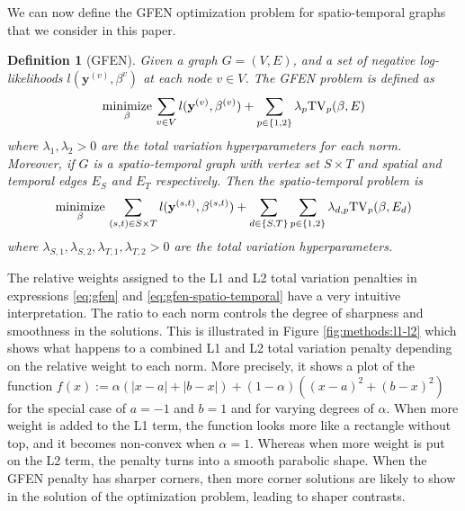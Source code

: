 \documentclass[a4paper, 11pt]{article}
\newtheorem{mydef}{Definition}
\begin{document}
We can now define the GFEN optimization problem for spatio-temporal graphs that we consider in this paper.

\begin{mydef}[GFEN]
Given a graph $G=(V, E)$, and a set of negative log-likelihoods $l(\mathbf{y}^{(v)}, \beta^{v})$ at each node $v\in V$. The GFEN problem is defined as 
\begin{equation}\label{eq:gfen}
    \operatornamewithlimits{minimize}_{\beta} \, \sum_{v \in V} l(\mathbf{y}^{(v)}, \beta^{(v)}) + \sum_{p \in \{1,2\}} \lambda_p \mathrm{TV}_p(\beta, E)
\end{equation}
where  $\lambda_{1}, \lambda_{2} > 0$ are the total variation hyperparameters for each norm. Moreover, if $G$ is a spatio-temporal graph with vertex set $S\times T$ and spatial and temporal edges $E_S$ and $E_T$ respectively. Then the spatio-temporal problem is
\begin{equation}\label{eq:gfen-spatio-temporal}
    \operatornamewithlimits{minimize}_{\beta} \, \sum_{(s,t) \in S \times T} l(\mathbf{y}^{(s,t)}, \beta^{(s,t)}) + \sum_{d \in \{S, T \}} \sum_{p \in \{1,2\}} \lambda_{d, p} \mathrm{TV}_p(\beta, E_d)
\end{equation}
where $\lambda_{S, 1}, \lambda_{S, 2}, \lambda_{T, 1}, \lambda_{T, 2} > 0$ are the total variation hyperparameters.
\end{mydef}

The relative weights assigned to the L1 and L2 total variation penalties in expressions \eqref{eq:gfen} and  \eqref{eq:gfen-spatio-temporal} have a very intuitive interpretation. The ratio to each norm controls the degree of sharpness and smoothness in the solutions. This is illustrated in Figure \ref{fig:methods:l1-l2} which shows what happens to a combined L1 and L2 total variation penalty depending on the relative weight to each norm. More precisely, it shows a plot of the function $f(x) := \alpha \left(|x - a| + |b - x|\right) + (1 - \alpha) \left((x - a)^2 + (b - x)^2\right)$ for the special case of $a=-1$ and $b=1$ and for varying degrees of $\alpha$. When more weight is added to the L1 term, the function looks more like a rectangle without top, and it becomes non-convex when $\alpha=1$. Whereas when more weight is put on the L2 term, the penalty turns into a smooth parabolic shape. When the GFEN penalty has sharper corners, then more corner solutions are likely to show in the solution of the optimization problem, leading to shaper contrasts.
\end{document}
